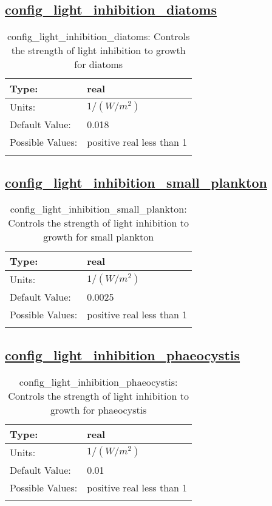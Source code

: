 \subsection[config\_light\_inhibition\_diatoms]{\hyperref[sec:nm_tab_biogeochemistry]{config\_light\_inhibition\_diatoms}}
\label{subsec:nm_sec_config_light_inhibition_diatoms}
\begin{center}
\begin{longtable}{| p{2.0in} || p{4.0in} |}
    \hline
    Type: & real \\
    \hline
    Units: & $1/(W/m^2)$ \\
    \hline
    Default Value: & 0.018 \\
    \hline
    Possible Values: & positive real less than 1 \\
    \hline
    \caption{config\_light\_inhibition\_diatoms: Controls the strength of light inhibition to growth for diatoms}
\end{longtable}
\end{center}
\subsection[config\_light\_inhibition\_small\_plankton]{\hyperref[sec:nm_tab_biogeochemistry]{config\_light\_inhibition\_small\_plankton}}
\label{subsec:nm_sec_config_light_inhibition_small_plankton}
\begin{center}
\begin{longtable}{| p{2.0in} || p{4.0in} |}
    \hline
    Type: & real \\
    \hline
    Units: & $1/(W/m^2)$ \\
    \hline
    Default Value: & 0.0025 \\
    \hline
    Possible Values: & positive real less than 1 \\
    \hline
    \caption{config\_light\_inhibition\_small\_plankton: Controls the strength of light inhibition to growth for small plankton}
\end{longtable}
\end{center}
\subsection[config\_light\_inhibition\_phaeocystis]{\hyperref[sec:nm_tab_biogeochemistry]{config\_light\_inhibition\_phaeocystis}}
\label{subsec:nm_sec_config_light_inhibition_phaeocystis}
\begin{center}
\begin{longtable}{| p{2.0in} || p{4.0in} |}
    \hline
    Type: & real \\
    \hline
    Units: & $1/(W/m^2)$ \\
    \hline
    Default Value: & 0.01 \\
    \hline
    Possible Values: & positive real less than 1 \\
    \hline
    \caption{config\_light\_inhibition\_phaeocystis: Controls the strength of light inhibition to growth for phaeocystis}
\end{longtable}
\end{center}
